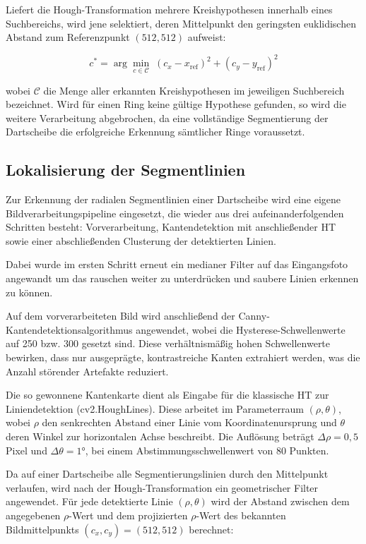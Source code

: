 Liefert die Hough-Transformation mehrere Kreishypothesen innerhalb
eines Suchbereichs, wird jene selektiert, deren Mittelpunkt den
geringsten euklidischen Abstand zum Referenzpunkt $(512, 512)$
aufweist:

\begin{equation}
    c^* = \arg\min_{c \in \mathcal{C}} \;
          \left(c_x - x_{\text{ref}}\right)^2 +
          \left(c_y - y_{\text{ref}}\right)^2
\end{equation}

\noindent

wobei $\mathcal{C}$ die Menge aller erkannten Kreishypothesen im jeweiligen Suchbereich bezeichnet. Wird für einen Ring keine gültige Hypothese gefunden, so wird die weitere Verarbeitung abgebrochen, da eine vollständige Segmentierung der Dartscheibe die erfolgreiche Erkennung sämtlicher Ringe voraussetzt.

\subsection{Lokalisierung der Segmentlinien}

Zur Erkennung der radialen Segmentlinien einer Dartscheibe wird eine eigene Bildverarbeitungspipeline eingesetzt, die wieder aus drei aufeinanderfolgenden Schritten besteht: Vorverarbeitung, Kantendetektion mit anschließender \ac{HT} sowie einer abschließenden Clusterung der detektierten Linien.

Dabei wurde im ersten Schritt erneut ein medianer Filter auf das Eingangsfoto angewandt um das rauschen weiter zu unterdrücken und saubere Linien erkennen zu können.

Auf dem vorverarbeiteten Bild wird anschließend der Canny-Kantendetektionsalgorithmus angewendet, wobei die Hysterese-Schwellenwerte auf 250 bzw. 300 gesetzt sind. Diese verhältnismäßig hohen Schwellenwerte bewirken, dass nur ausgeprägte, kontrastreiche Kanten extrahiert werden, was die Anzahl störender Artefakte reduziert.

Die so gewonnene Kantenkarte dient als Eingabe für die klassische \ac{HT} zur Liniendetektion (cv2.HoughLines). Diese arbeitet im Parameterraum $(\rho, \theta)$, wobei $\rho$ den senkrechten Abstand einer Linie vom Koordinatenursprung und $\theta$ deren Winkel zur horizontalen Achse beschreibt. Die Auflösung beträgt $\Delta\rho=0,5$ Pixel und $\Delta\theta=1$°, bei einem Abstimmungsschwellenwert von 80 Punkten.

Da auf einer Dartscheibe alle Segmentierungslinien durch den Mittelpunkt verlaufen, wird nach der Hough-Transformation ein geometrischer Filter angewendet. Für jede detektierte Linie $(\rho, \theta)$ wird der Abstand zwischen dem angegebenen $\rho$-Wert und dem projizierten $\rho$-Wert des bekannten Bildmittelpunkts $(c_x, c_y) = (512, 512)$ berechnet:
 

